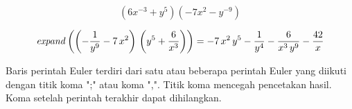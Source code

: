 \documentclass[a4paper,10pt]{article}
\begin{document}
\begin{eulernotebook}
\begin{eulercomment}
\end{eulercomment}
\begin{eulerformula}
\[
(6x^{-3}+y^5)(-7x^2-y^{-9})
\]
\end{eulerformula}
\begin{eulerformula}
\[
{\it expand}\left(\left(-\frac{1}{y^9}-7\,x^2\right)\,\left(y^5+  \frac{6}{x^3}\right)\right)=-7\,x^2\,y^5-\frac{1}{y^4}-\frac{6}{x^3  \,y^9}-\frac{42}{x}
\]
\end{eulerformula}
\begin{eulercomment}
\end{eulercomment}
\begin{eulercomment}
Baris perintah Euler terdiri dari satu atau beberapa perintah Euler
yang diikuti dengan titik koma ";" atau koma ",". Titik koma mencegah
pencetakan hasil. Koma setelah perintah terakhir dapat dihilangkan.


\end{eulercomment}
\end{eulernotebook}
\end{document}
